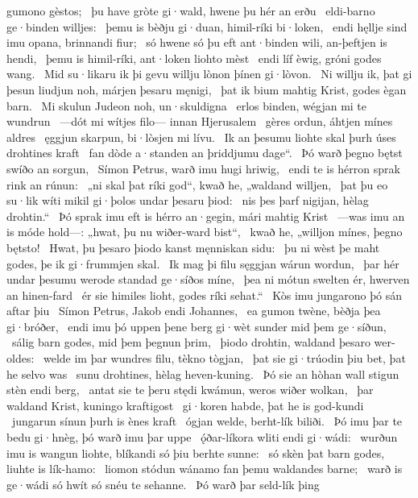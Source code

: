 gumono gèstos; \hld\ þu have gròte gi·wald,
hwene þu hér an erðu \hld\ eldi-barno
ge·binden willjes: \hld\ þemu is bèðju gi·duan,
himil-ríki bi·loken, \hld\ endi hęllje sind imu opana,
brinnandi fiur; \hld\ só hwene só þu eft ant·binden wili,
an-þeftjen is hendi, \hld\ þemu is himil-ríki,
ant·loken liohto mèst \hld\ endi líf èwig,
gróni godes wang. \hld\ Mid su·likaru ik þi gevu willju
lònon þínen gi·lòvon. \hld\ Ni willju ik, þat gi þesun liudjun noh,
márjen þesaru męnigi, \hld\ þat ik bium mahtig Krist,
godes ègan barn. \hld\ Mi skulun Judeon noh,
un·skuldigna \hld\ erlos binden,
wégjan mi te wundrun \hld\ —dót mi wítjes filo—
innan Hjerusalem \hld\ gères ordun,
áhtjen mínes aldres \hld\ ęggjun skarpun,
bi·lòsjen mi lívu. \hld\ Ik an þesumu liohte skal
þurh úses drohtines kraft \hld\ fan dòde a·standen
an þriddjumu dage“. \hld\ Þó warð þegno bętst
swíðo an sorgun, \hld\ Símon Petrus,
warð imu hugi hriwig, \hld\ endi te is hérron sprak
rink an rúnun: \hld\ „ni skal þat ríki god“, kwað he,
„waldand willjen, \hld\ þat þu eo su·lik wíti mikil
gi·þolos undar þesaru þiod: \hld\ nis þes þarf nigijan,
hèlag drohtin.“ \hld\ Þó sprak imu eft is hérro an·gegin,
mári mahtig Krist \hld\ —was imu an is móde hold—:
„hwat, þu nu wiðer-ward bist“, \hld\ kwað he, „willjon mínes,
þegno bętsto! \hld\ Hwat, þu þesaro þiodo kanst
męnniskan sidu: \hld\ þu ni wèst þe maht godes,
þe ik gi·frummjen skal. \hld\ Ik mag þi filu sęggjan
wárun wordun, \hld\ þar hér undar þesumu werode standad
ge·síðos míne, \hld\ þea ni mótun swelten ér,
hwerven an hinen-fard \hld\ ér sie himiles lioht,
godes ríki sehat.“ \hld\ Kòs imu jungarono þó
sán aftar þiu \hld\ Símon Petrus,
Jakob endi Johannes, \hld\ ea gumon twène,
bèðja þea gi·bróðer, \hld\ endi imu þó uppen þene berg gi·wèt
sunder mid þem ge·síðun, \hld\ sálig barn godes,
mid þem þegnun þrim, \hld\ þiodo drohtin,
waldand þesaro wer-oldes: \hld\ welde im þar wundres filu,
tèkno tògjan, \hld\ þat sie gi·trúodin þiu bet,
þat he selvo was \hld\ sunu drohtines,
hèlag heven-kuning. \hld\ Þó sie an hòhan wall
stigun stèn endi berg, \hld\ antat sie te þeru stędi kwámun,
weros wiðer wolkan, \hld\ þar waldand Krist,
kuningo kraftigost \hld\ gi·koren habde,
þat he is god-kundi \hld\ jungarun sínun
þurh is ènes kraft \hld\ ógjan welde,
berht-lík biliði. \hld\ Þó imu þar te bedu gi·hnèg,
þó warð imu þar uppe \hld\ ǫ́ðar-líkora
wliti endi gi·wádi: \hld\ wurðun imu is wangun liohte,
blíkandi só þiu berhte sunne: \hld\ só skèn þat barn godes,
liuhte is lík-hamo: \hld\ liomon stódun
wánamo fan þemu waldandes barne; \hld\ warð is ge·wádi só hwít
só snéu te sehanne. \hld\ Þó warð þar seld-lík þing
